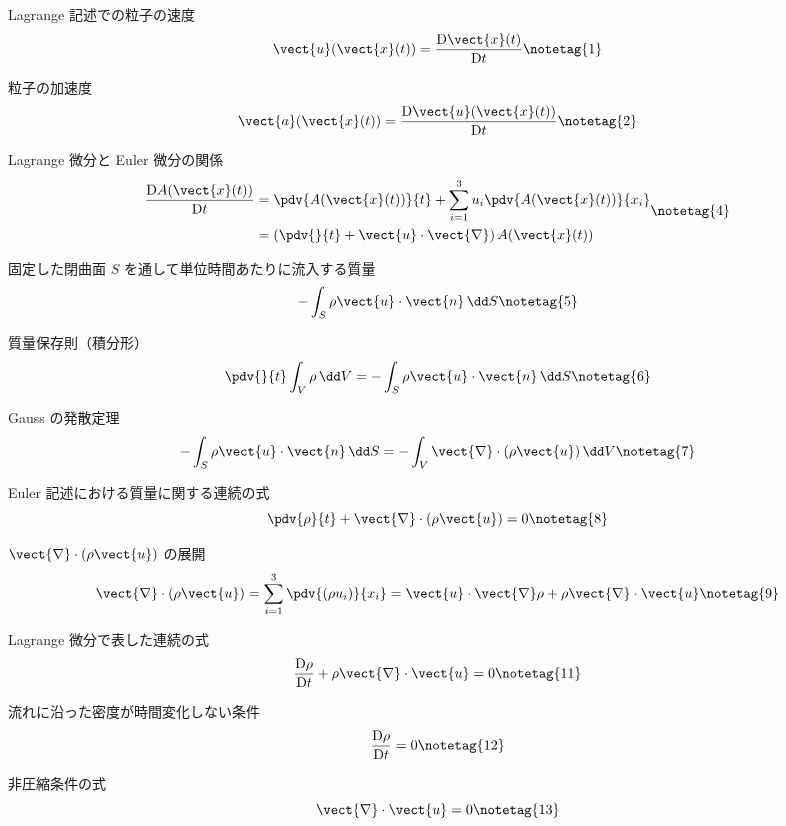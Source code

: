 \documentclass[uplatex,dvipdfmx,a4paper,11pt]{jsarticle}
\begin{document}
\begin{kirokuichiran}
\end{kirokuichiran}

\youtenseiri
\begin{noteshikilist}
  \item Lagrange 記述での粒子の速度 %
    \[ \vect{u}(\vect{x}(t)) = \frac{\mathrm{D}\vect{x}(t)}{\mathrm{D}t} \notetag{1} \]
  \item 粒子の加速度 %
    \[ \vect{a}(\vect{x}(t)) = \frac{\mathrm{D}\vect{u}(\vect{x}(t))}{\mathrm{D}t} \notetag{2} \]
  \item Lagrange 微分と Euler 微分の関係 %
    \[ \begin{aligned} \frac{\mathrm{D}A(\vect{x}(t))}{\mathrm{D}t} &= \pdv{A(\vect{x}(t))}{t} + \sum_{i=1}^{3} u_i\pdv{A(\vect{x}(t))}{x_i} \\ &= \left(\pdv{}{t} + \vect{u}\cdot\vect{\nabla}\right)A(\vect{x}(t)) \end{aligned} \notetag{4} \]
  \item 固定した閉曲面 $S$ を通して単位時間あたりに流入する質量 %
    \[ -\int_S \rho\vect{u}\cdot\vect{n}\,\dd S \notetag{5} \]
  \item 質量保存則（積分形） %
    \[ \pdv{}{t}\int_V \rho\,\dd V = -\int_S \rho\vect{u}\cdot\vect{n}\,\dd S \notetag{6} \]
  \item Gauss の発散定理 %
    \[ -\int_S \rho\vect{u}\cdot\vect{n}\,\dd S = -\int_V \vect{\nabla}\cdot(\rho\vect{u})\,\dd V \notetag{7} \]
  \item Euler 記述における質量に関する連続の式 %
    \[ \pdv{\rho}{t} + \vect{\nabla}\cdot(\rho\vect{u}) = 0 \notetag{8} \]
  \item $\vect{\nabla}\cdot(\rho\vect{u})$ の展開 %
    \[ \vect{\nabla}\cdot(\rho\vect{u}) = \sum_{i=1}^{3}\pdv{(\rho u_i)}{x_i} = \vect{u}\cdot\vect{\nabla}\rho + \rho\vect{\nabla}\cdot\vect{u} \notetag{9} \]
  \item Lagrange 微分で表した連続の式 %
    \[ \frac{\mathrm{D}\rho}{\mathrm{D}t} + \rho\vect{\nabla}\cdot\vect{u} = 0 \notetag{11} \]
  \item 流れに沿った密度が時間変化しない条件 %
    \[ \frac{\mathrm{D}\rho}{\mathrm{D}t} = 0 \notetag{12} \]
  \item 非圧縮条件の式 %
    \[ \vect{\nabla}\cdot\vect{u} = 0 \notetag{13} \]
\end{noteshikilist}
\end{document}
